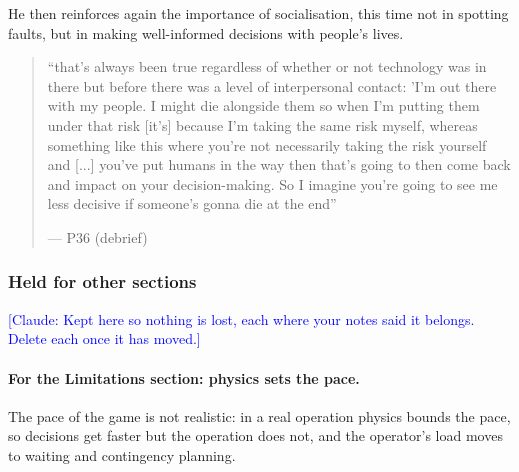 He then reinforces again the importance of socialisation, this time not in spotting faults, but in making well-informed decisions with people's lives.
\begin{quote}\small
``that's always been true regardless of whether or not technology was in there but before there was a level of interpersonal contact: 'I'm out there with my people. I might die alongside them so when I'm putting them under that risk [it's] because I'm taking the same risk myself, whereas something like this where you're not necessarily taking the risk yourself and [...] you've put humans in the way then that's going to then come back and impact on your decision-making. So I imagine you're going to see me less decisive if someone's gonna die at the end''\par\hfill--- P36 (debrief)
\end{quote}

\subsubsection*{Held for other sections}\label{sec:qual:practitioner:held}

\textcolor{blue}{[Claude: Kept here so nothing is lost, each where your notes said it belongs. Delete each once it has moved.]}

\paragraph{For the Limitations section: physics sets the pace.}\label{sec:qual:practitioner:pt-physics-pace}\label{sec:qual:practitioner:pt-tempo-echelon}

The pace of the game is not realistic: in a real operation physics bounds the pace, so decisions get faster but the operation does not, and the operator's load moves to waiting and contingency planning.

